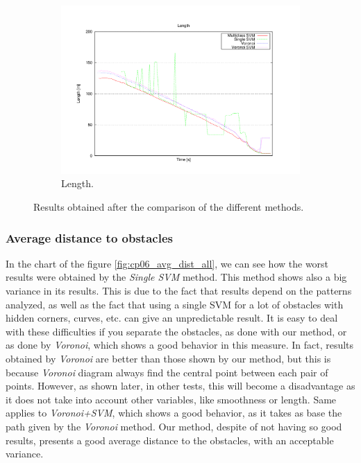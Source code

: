 \begin{figure}
  \ContinuedFloat
  \begin{subfigure}[b]{\textwidth}
	  \centering
	  \includegraphics[width=\textwidth, trim=55 50 85 60,clip]{figure13}
	  \caption{Length.}
	  \label{fig:cp06_length_all}
  \end{subfigure}
  
  \caption{Results obtained after the comparison of the different methods.}\label{fig:cp06_results_comparison}
\end{figure}

\subsubsection{Average distance to obstacles}\label{ch:chapter06_02_02_01}

In the chart of the figure \ref{fig:cp06_avg_dist_all}, we can see how the worst results were obtained by the \textit{Single \ac{SVM}} method. This method shows also a big variance in its results. This is due to the fact that results depend on the patterns analyzed, as well as the fact that using a single \ac{SVM} for a lot of obstacles with hidden corners, curves, etc. can give an unpredictable result. It is easy to deal with these difficulties if you separate the obstacles, as done with our method, or as done by \textit{Voronoi}, which shows a good behavior in this measure. In fact, results obtained by \textit{Voronoi} are better than those shown by our method, but this is because \textit{Voronoi} diagram always find the central point between each pair of points. However, as shown later, in other tests, this will become a disadvantage as it does not take into account other variables, like smoothness or length. Same applies to \textit{Voronoi+\ac{SVM}}, which shows a good behavior, as it takes as base the path given by the \textit{Voronoi} method.
Our method, despite of not having so good results, presents a good average distance to the obstacles, with an acceptable variance.

